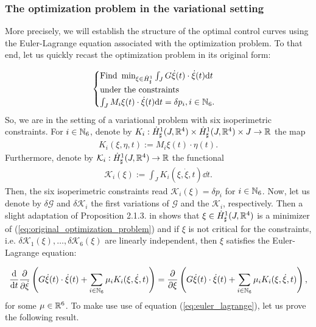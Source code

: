 \subsubsection{The optimization problem in the variational setting}
More precisely, we will establish the structure of the optimal control curves using the Euler-Lagrange equation associated with the optimization problem. To that end, let us quickly recast the optimization problem in its original form:

\begin{align}
\label{eq:original_optimization_problem}
\begin{cases}
 \text{Find } \min_{\xi \in \dot{H}^1_{\sharp}} \int_{J} G \dot{\xi}(t) \cdot \dot{\xi}(t) \mathrm{d}t\\
 \text{under the constraints }\\
 \int_{J} M_i \xi(t) \cdot \dot{\xi}(t) \mathrm{d}t = \delta p_i, i \in \mathbb{N}_6.
 \end{cases}
\end{align}
So, we are in the setting of a variational problem with six isoperimetric constraints. For $i \in \mathbb{N}_6$, denote by $K_i: \dot{H}^{1}_{\sharp}(J, \mathbb{R}^4) \times \dot{H}^{1}_{\sharp}(J, \mathbb{R}^4) \times J \to \mathbb{R}$ the map
\begin{align}
	K_i(\xi, \eta, t) := M_i \xi(t) \cdot \eta(t).
\end{align}
Furthermore, denote by $\mathcal{K}_i : \dot{H}^{1}_{\sharp}(J, \mathbb{R}^4) \to \mathbb{R}$ the functional
\begin{align}
	\mathcal{K}_i(\xi) := \int_{J} K_i(\xi, \dot{\xi}, t) \dd t.
\end{align}
Then, the six isoperimetric constraints read $\mathcal{K}_i(\xi) = \delta p_i$ for $i \in \mathbb{N}_6$. Now, let us denote by $\delta \mathcal{G}$ and $\delta \mathcal{K}_i$ the first variations of $\mathcal{G}$ and the $\mathcal{K}_i$, respectively. Then a slight adaptation of Proposition 2.1.3. in \cite{Kielhoefer2018} shows that $\xi \in \dot{H}^{1}_{\sharp}(J, \mathbb{R}^4)$ is a minimizer of (\ref{eq:original_optimization_problem}) and if $\xi$ is not critical for the constraints, i.e. $\delta \mathcal{K}_1(\xi), \dotsc, \delta \mathcal{K}_6(\xi)$ are linearly independent, then $\xi$ satisfies the Euler-Lagrange equation:

\begin{align}
\label{eq:euler_lagrange}
\frac{\dd}{\dd t} \frac{\partial}{\partial \dot{\xi}} \left ( G \dot{\xi}(t) \cdot \dot{\xi}(t) + \sum_{i \in \N_6} \mu_i K_i(\xi, \dot{\xi}, t)\right ) = \frac{\partial}{\partial \xi} \left ( G \dot{\xi}(t) \cdot \dot{\xi}(t) + \sum_{i \in \N_6} \mu_i K_i(\xi, \dot{\xi}, t)\right ),
\end{align}
for some $\mu \in \mathbb{R}^6$. To make use use of equation (\ref{eq:euler_lagrange}), let us prove the following result.

